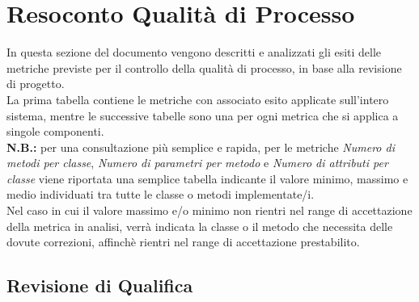 \newpage
\section{Resoconto Qualità di Processo}

In questa sezione del documento vengono descritti e analizzati gli esiti delle metriche previste per il controllo della qualità di processo, in base alla revisione di progetto.\\
La prima tabella contiene le metriche con associato esito applicate sull'intero sistema, mentre le successive tabelle sono una per ogni metrica che si applica a singole componenti.\\
\textbf{N.B.:} per una consultazione più semplice e rapida, per le metriche \textit{Numero di metodi per classe}, \textit{Numero di parametri per metodo} e \textit{Numero di attributi per classe} viene riportata una semplice tabella indicante il valore minimo, massimo e medio individuati tra tutte le classe o metodi implementate/i.\\
Nel caso in cui il valore massimo e/o minimo non rientri nel range di accettazione della metrica in analisi, verrà indicata la classe o il metodo che necessita delle dovute correzioni, affinchè rientri nel range di accettazione prestabilito.

	\subsection{Revisione di Qualifica}
	
